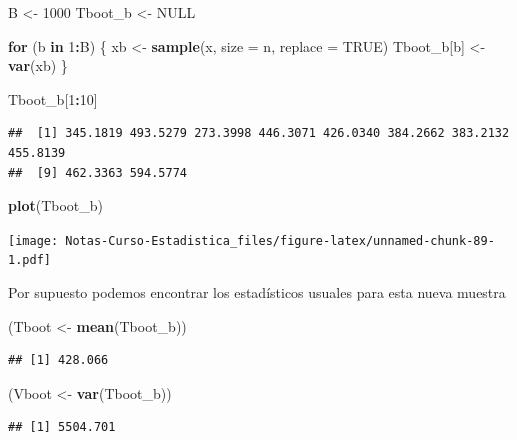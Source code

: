 \documentclass[
  12pt,
]{book}
\newenvironment{Shaded}{\begin{snugshade}}{\end{snugshade}}
\newcommand{\ControlFlowTok}[1]{\textcolor[rgb]{0.13,0.29,0.53}{\textbf{#1}}}
\newcommand{\DataTypeTok}[1]{\textcolor[rgb]{0.13,0.29,0.53}{#1}}
\newcommand{\DecValTok}[1]{\textcolor[rgb]{0.00,0.00,0.81}{#1}}
\newcommand{\KeywordTok}[1]{\textcolor[rgb]{0.13,0.29,0.53}{\textbf{#1}}}
\newcommand{\NormalTok}[1]{#1}
\newcommand{\OperatorTok}[1]{\textcolor[rgb]{0.81,0.36,0.00}{\textbf{#1}}}
\newcommand{\OtherTok}[1]{\textcolor[rgb]{0.56,0.35,0.01}{#1}}
\newcommand{\StringTok}[1]{\textcolor[rgb]{0.31,0.60,0.02}{#1}}
\theoremstyle{definition}
\theoremstyle{definition}
\theoremstyle{definition}
\theoremstyle{remark}
\begin{document}
\begin{Shaded}
\begin{Highlighting}[]
\NormalTok{B <-}\StringTok{ }\DecValTok{1000}
\NormalTok{Tboot_b <-}\StringTok{ }\OtherTok{NULL}

\ControlFlowTok{for}\NormalTok{ (b }\ControlFlowTok{in} \DecValTok{1}\OperatorTok{:}\NormalTok{B) \{}
\NormalTok{    xb <-}\StringTok{ }\KeywordTok{sample}\NormalTok{(x, }\DataTypeTok{size =}\NormalTok{ n, }\DataTypeTok{replace =} \OtherTok{TRUE}\NormalTok{)}
\NormalTok{    Tboot_b[b] <-}\StringTok{ }\KeywordTok{var}\NormalTok{(xb)}
\NormalTok{\}}

\NormalTok{Tboot_b[}\DecValTok{1}\OperatorTok{:}\DecValTok{10}\NormalTok{]}
\end{Highlighting}
\end{Shaded}

\begin{verbatim}
##  [1] 345.1819 493.5279 273.3998 446.3071 426.0340 384.2662 383.2132 455.8139
##  [9] 462.3363 594.5774
\end{verbatim}

\begin{Shaded}
\begin{Highlighting}[]
\KeywordTok{plot}\NormalTok{(Tboot_b)}
\end{Highlighting}
\end{Shaded}

\texttt{[image: Notas-Curso-Estadistica\_files/figure-latex/unnamed-chunk-89-1.pdf]}

Por supuesto podemos encontrar los estadísticos usuales para esta nueva muestra

\begin{Shaded}
\begin{Highlighting}[]
\NormalTok{(Tboot <-}\StringTok{ }\KeywordTok{mean}\NormalTok{(Tboot_b))}
\end{Highlighting}
\end{Shaded}

\begin{verbatim}
## [1] 428.066
\end{verbatim}

\begin{Shaded}
\begin{Highlighting}[]
\NormalTok{(Vboot <-}\StringTok{ }\KeywordTok{var}\NormalTok{(Tboot_b))}
\end{Highlighting}
\end{Shaded}

\begin{verbatim}
## [1] 5504.701
\end{verbatim}
\end{document}
